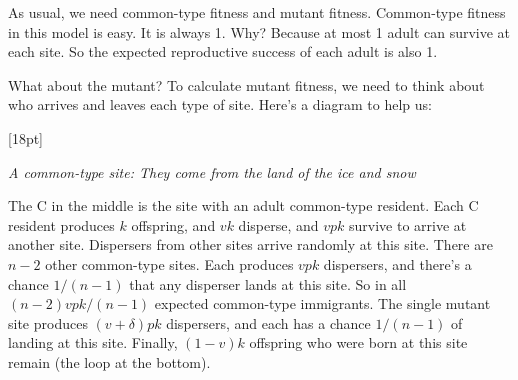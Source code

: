 \documentclass[10pt,reqno]{amsbook}
\newcommand{\margincap}[2][10pt]{\marginnote{\small\emph{#2}}[#1]}
\newcounter{myfigure}[chapter]
\newcommand{\figmarlab}[2][18pt]{%
  \refstepcounter{myfigure}%
  \label{#2}%
  \margincap[#1]{Figure\\\thechapter.\themyfigure}%
}
\numberwithin{equation}{chapter}
\begin{document}
As usual, we need common-type fitness and mutant fitness. Common-type fitness in this model is easy. It is always 1. Why? Because at most 1 adult can survive at each site. So the expected reproductive success of each adult is also 1. 

What about the mutant? To calculate mutant fitness, we need to think about who arrives and leaves each type of site. Here's a diagram to help us:

\vspace{-6pt}
\figmarlab{figKdispersal1}
\begin{center}

	\vspace{6pt}
	\emph{A common-type site: They come from the land of the ice and snow}
	\vspace{6pt}
\end{center}

The C in the middle is the site with an adult common-type resident. Each C resident produces $k$ offspring, and $vk$ disperse, and $vpk$ survive to arrive at another site. Dispersers from other sites arrive randomly at this site. There are $n-2$ other common-type sites. Each produces $vpk$ dispersers, and there's a chance $1/(n-1)$ that any disperser lands at this site. So in all $(n-2)vpk/(n-1)$ expected common-type immigrants. The single mutant site produces $(v+\delta)pk$ dispersers, and each has a chance $1/(n-1)$ of landing at this site. Finally, $(1-v)k$ offspring who were born at this site remain (the loop at the bottom).
\end{document}
